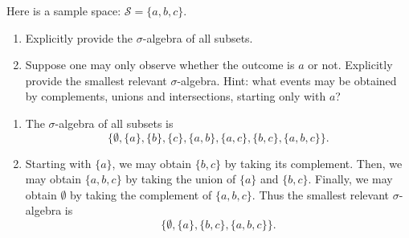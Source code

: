 \documentclass[12pt]{article}
\newenvironment{problem}[2][Problem]{\begin{trivlist}
\item[\hskip \labelsep {\bfseries #1}\hskip \labelsep {\bfseries #2.}]}
{\end{trivlist}}
\begin{document}
\begin{problem}{2}
  Here is a sample space: $\mathcal{S} = \{a, b, c\}$.
  \begin{enumerate}
    \item Explicitly provide the $\sigma$-algebra of all subsets.
    \item Suppose one may only observe whether the outcome is $a$ or not.
    Explicitly provide the smallest relevant $\sigma$-algebra. Hint: what
    events may be obtained by complements, unions and intersections,
    starting only with ${a}$?
  \end{enumerate}
  \begin{enumerate}
    \item The $\sigma$-algebra of all subsets is
    \[
      \{\emptyset, \{a\}, \{b\}, \{c\}, \{a,b\}, \{a,c\}, \{b,c\}, \{a,b,c\}\}.
    \]
    \item 
    Starting with $\{a\}$, we may obtain $\{b,c\}$ by taking its complement.
    Then, we may obtain $\{a, b, c\}$ by taking the union of $\{a\}$ and
    $\{b,c\}$. Finally, we may obtain $\emptyset$ by taking the complement
    of $\{a, b, c\}$. Thus the smallest relevant $\sigma$-algebra is
    \[
    \{\emptyset, \{a\}, \{b,c\}, \{a,b,c\}\}.
    \]
  \end{enumerate}
\end{problem}
\end{document}
